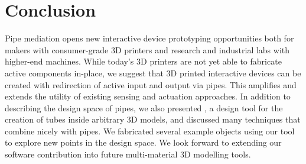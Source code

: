 \section{Conclusion}

Pipe mediation opens new interactive device prototyping opportunities both for makers with consumer-grade 3D printers and research and industrial labs with higher-end machines.  While today's 3D printers are not yet able to fabricate active components in-place, we suggest that 3D printed interactive devices can be created with redirection of active input and output via pipes.  This amplifies and extends the utility of existing sensing and actuation approaches.  In addition to describing the design space of pipes, we also presented \systemnamenospace, a design tool for the creation of tubes inside arbitrary 3D models, and discussed many techniques that combine nicely with pipes.  We fabricated several example objects using our tool to explore new points in the design space.  We look forward to extending our software contribution into future multi-material 3D modelling tools.